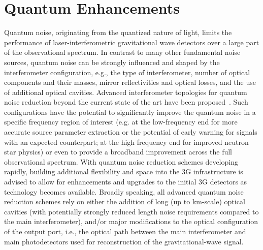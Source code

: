 \chapter{Quantum Enhancements}
\label{sec:Quantum}

\vspace{1 cm} 
Quantum noise, originating from the quantized nature of light, limits the performance of laser-interferometric gravitational wave detectors over a large part of the observational spectrum. In contrast to many other fundamental noise sources, quantum noise can be strongly influenced and shaped by the interferometer configuration, e.g., the type of interferometer, number of optical components and their masses, mirror reflectivities and optical losses, and the use of additional optical cavities. Advanced interferometer topologies for quantum noise reduction beyond the current state of the art have been proposed~\cite{Danilishin:2019dxq}. Such configurations have the potential to significantly improve the quantum noise in a specific frequency region of interest (e.g. at the low-frequency end for more accurate source parameter extraction or the potential of early warning for signals with an expected counterpart; at the high frequency end for improved neutron star physics) or even to provide a broadband improvement across the full observational spectrum. 
With quantum noise reduction schemes developing rapidly, building additional flexibility and space into the 3G infrastructure is advised to allow for enhancements and upgrades to the initial 3G detectors as technology becomes available. 
Broadly speaking, all advanced quantum noise reduction schemes rely on either the addition of long (up to km-scale) optical cavities (with potentially strongly reduced length noise requirements compared to the main interferometer), and/or major modifications to the optical configuration of the output port, i.e., the optical path between the main interferometer and main photodetectors used for reconstruction of the gravitational-wave signal. 
